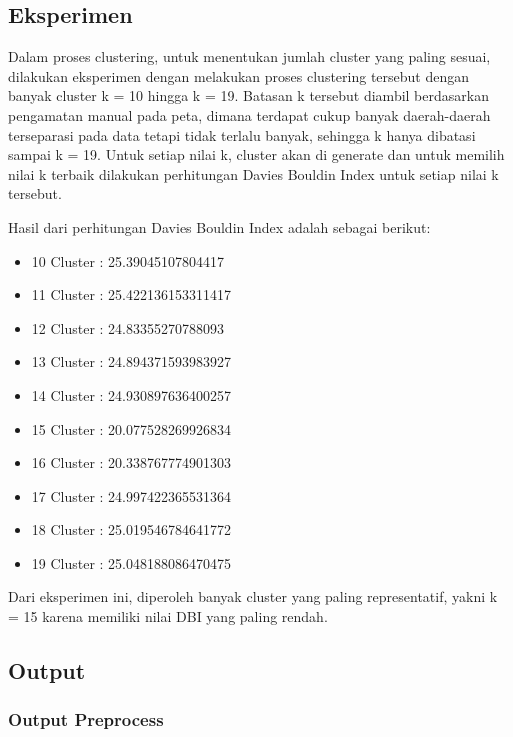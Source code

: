 \documentclass{article}
\begin{document}
\subsection{Eksperimen}

\begin{adjustwidth}{2em}{0pt}
	
\hspace{\parindent}Dalam proses clustering, untuk menentukan jumlah cluster yang paling sesuai, dilakukan eksperimen dengan melakukan proses clustering tersebut dengan banyak cluster k = 10 hingga k = 19. Batasan k tersebut diambil berdasarkan pengamatan manual pada peta, dimana terdapat cukup banyak daerah-daerah terseparasi pada data tetapi tidak terlalu banyak, sehingga k hanya dibatasi sampai k = 19. Untuk setiap nilai k, cluster akan di generate dan untuk memilih nilai k terbaik dilakukan perhitungan Davies Bouldin Index untuk setiap nilai k tersebut.

Hasil dari perhitungan Davies Bouldin Index adalah sebagai berikut: 

\begin{itemize}
	\item{10 Cluster : 25.39045107804417}
	\item{11 Cluster : 25.422136153311417}
	\item{12 Cluster : 24.83355270788093}
	\item{13 Cluster : 24.894371593983927}
	\item{14 Cluster : 24.930897636400257}
	\item{15 Cluster : 20.077528269926834}
	\item{16 Cluster : 20.338767774901303}
	\item{17 Cluster : 24.997422365531364}
	\item{18 Cluster : 25.019546784641772}
	\item{19 Cluster : 25.048188086470475}	
\end{itemize}

Dari eksperimen ini, diperoleh banyak cluster yang paling representatif, yakni k = 15 karena memiliki nilai DBI yang paling rendah.

\end{adjustwidth}

\subsection{Output}

\subsubsection{Output Preprocess}
\end{document}
